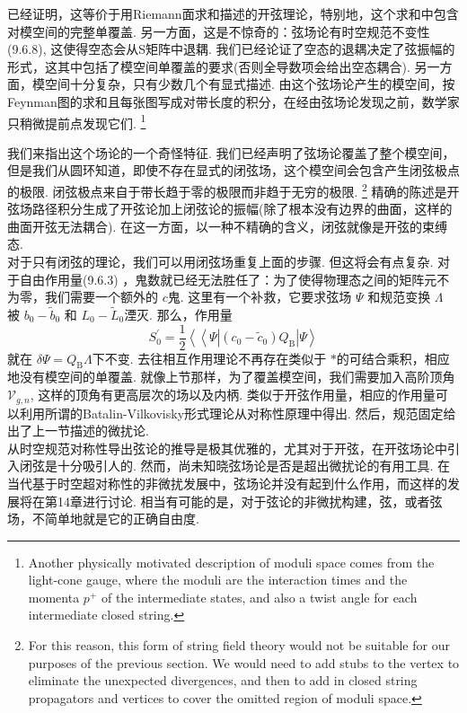已经证明，这等价于用Riemann面求和描述的开弦理论，特别地，这个求和中包含对模空间的完整单覆盖. 另一方面，这是不惊奇的：弦场论有时空规范不变性 (9.6.8), 这使得空态会从S矩阵中退耦. 我们已经论证了空态的退耦决定了弦振幅的形式，这其中包括了模空间单覆盖的要求(否则全导数项会给出空态耦合). 另一方面，模空间十分复杂，只有少数几个有显式描述. 由这个弦场论产生的模空间，按Feynman图的求和且每张图写成对带长度的积分，在经由弦场论发现之前，数学家只稍微提前点发现它们.
\footnote{Another physically motivated description of moduli space comes from the light-cone gauge, where the moduli are the interaction times and the momenta $p^{+}$ of the intermediate states, and also a twist angle for each intermediate closed string.}

我们来指出这个场论的一个奇怪特征. 我们已经声明了弦场论覆盖了整个模空间，但是我们从圆环知道，即使不存在显式的闭弦场，这个模空间会包含产生闭弦极点的极限. 闭弦极点来自于带长趋于零的极限而非趋于无穷的极限. 
\footnote{For this reason, this form of string field theory would not be suitable for our purposes of the previous section. We would need to add stubs to the vertex to eliminate the unexpected divergences, and then to add in closed string propagators and vertices to cover the omitted region of moduli space.}
精确的陈述是开弦场路径积分生成了开弦论加上闭弦论的振幅(除了根本没有边界的曲面，这样的曲面开弦无法耦合). 在这一方面，以一种不精确的含义，闭弦就像是开弦的束缚态.\\
对于只有闭弦的理论，我们可以用闭弦场重复上面的步骤. 但这将会有点复杂. 对于自由作用量(9.6.3) ，鬼数就已经无法胜任了：为了使得物理态之间的矩阵元不为零，我们需要一个额外的 $c$鬼. 这里有一个补救，它要求弦场 $\Psi$ 和规范变换 $\Lambda$ 被 $b_{0}-\tilde{b}_{0}$ 和 $L_{0}-\tilde{L}_{0} $湮灭. 那么，作用量
\begin{equation}
	S_{0}^{\prime}=\frac{1}{2}\left\langle\left\langle\Psi\left|\left(c_{0}-\tilde{c}_{0}\right) Q_{\mathrm{B}}\right| \Psi\right\rangle\right.
\end{equation}
就在 $\delta \Psi=Q_{\mathrm{B}} \Lambda $下不变. 去往相互作用理论不再存在类似于 $*$的可结合乘积，相应地没有模空间的单覆盖. 就像上节那样，为了覆盖模空间，我们需要加入高阶顶角$\mathscr{V}_{g, n}$, 这样的顶角有更高层次的场以及内柄. 类似于开弦作用量，相应的作用量可以利用所谓的Batalin-Vilkovisky形式理论从对称性原理中得出. 然后，规范固定给出了上一节描述的微扰论.\\
从时空规范对称性导出弦论的推导是极其优雅的，尤其对于开弦，在开弦场论中引入闭弦是十分吸引人的. 然而，尚未知晓弦场论是否是超出微扰论的有用工具. 在当代基于时空超对称性的非微扰发展中，弦场论并没有起到什么作用，而这样的发展将在第14章进行讨论. 相当有可能的是，对于弦论的非微扰构建，弦，或者弦场，不简单地就是它的正确自由度.

